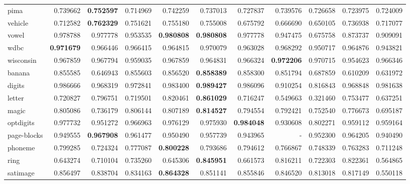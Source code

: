 \begin{tabular}{lrrrrrrrrrr}
pima            &   0.739662 &  \textbf{0.752597} &  0.714969 &  0.742259 &  0.737013 &  0.727837 &  0.739576 &  0.726658 &  0.723975 &  0.724009 \\
vehicle         &   0.712582 &  \textbf{0.762329} &  0.751621 &  0.755180 &  0.755008 &  0.675792 &  0.666690 &  0.650105 &  0.736938 &  0.717077 \\
vowel           &   0.978788 &  0.977778 &  0.953535 &  \textbf{0.980808} &  \textbf{0.980808} &  0.977778 &  0.947475 &  0.675758 &  0.873737 &  0.909091 \\
wdbc            &   \textbf{0.971679} &  0.966446 &  0.966415 &  0.964815 &  0.970079 &  0.963028 &  0.968292 &  0.950717 &  0.964876 &  0.943821 \\
wisconsin       &   0.967859 &  0.967794 &  0.959035 &  0.967859 &  0.964831 &  0.966324 &  \textbf{0.972206} &  0.970715 &  0.954623 &  0.966346 \\
banana          &   0.855585 &  0.646943 &  0.855603 &  0.856520 &  \textbf{0.858389} &  0.858300 &  0.851794 &  0.687859 &  0.610209 &  0.631972 \\
digits          &   0.986666 &  0.968319 &  0.972841 &  0.983400 &  \textbf{0.989427} &  0.986096 &  0.910254 &  0.816843 &  0.968848 &  0.981638 \\
letter          &   0.720827 &  0.796751 &  0.719501 &  0.820461 &  \textbf{0.861029} &  0.716247 &  0.549663 &  0.321460 &  0.753477 &  0.637251 \\
magic           &   0.805086 &  0.736179 &  0.806144 &  0.807189 &  \textbf{0.814527} &  0.794554 &  0.792421 &  0.752540 &  0.776673 &  0.695187 \\
optdigits       &   0.977732 &  0.951272 &  0.966963 &  0.976129 &  0.975930 &  \textbf{0.984048} &  0.930608 &  0.802271 &  0.959112 &  0.959164 \\
page-blocks     &   0.949555 &  \textbf{0.967908} &  0.961477 &  0.950490 &  0.957739 &  0.943965 &       - &  0.952300 &  0.964205 &  0.940490 \\
phoneme         &   0.799285 &  0.724324 &  0.777087 &  \textbf{0.800228} &  0.793686 &  0.794612 &  0.766867 &  0.748339 &  0.763283 &  0.711248 \\
ring            &   0.643274 &  0.710104 &  0.735260 &  0.645306 &  \textbf{0.845951} &  0.661573 &  0.816211 &  0.722303 &  0.822361 &  0.564865 \\
satimage        &   0.856497 &  0.838704 &  0.834163 &  \textbf{0.864328} &  0.851141 &  0.855846 &  0.846520 &  0.813018 &  0.817149 &  0.550118 \\

\end{tabular}
